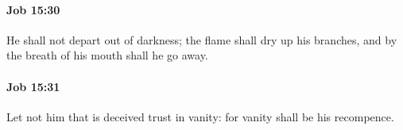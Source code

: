 		\paragraph{Job 15:30} %
			\label{JOB-15-30}

			He shall not depart out of darkness; the flame shall dry up his branches, and by the breath of his mouth shall he go away.


		\paragraph{Job 15:31} %
			\label{JOB-15-31}

			Let not him that is deceived trust in vanity: for vanity shall be his recompence.


